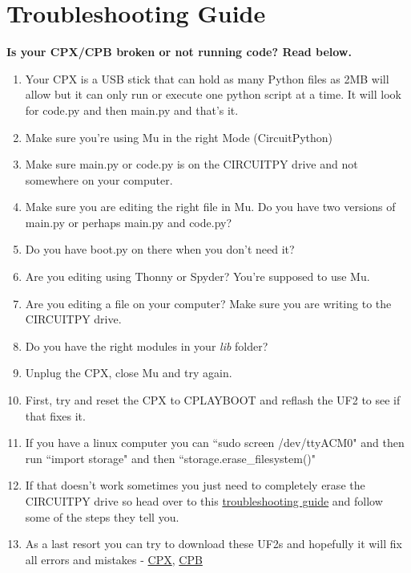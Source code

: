 \section{Troubleshooting Guide}

{\bf Is your CPX/CPB broken or not running code? Read below.}

\begin{enumerate}[itemsep=-5pt]
  \item Your CPX is a USB stick that can hold as many Python files as 2MB will allow but it can only run or execute one python script at a time. It will look for code.py and then main.py and that's it. 
  \item Make sure you're using Mu in the right Mode (CircuitPython)
  \item Make sure main.py or code.py is on the CIRCUITPY drive and not somewhere on your computer.
  \item Make sure you are editing the right file in Mu. Do you have two versions of main.py or perhaps main.py and code.py?
  \item Do you have boot.py on there when you don't need it?
  \item Are you editing using Thonny or Spyder? You're supposed to use Mu. 
  \item Are you editing a file on your computer? Make sure you are
    writing to the CIRCUITPY drive.
  \item Do you have the right modules in your {\it lib} folder?
  \item Unplug the CPX, close Mu and try again.
  \item First, try and reset the CPX to CPLAYBOOT and reflash the UF2 to see if that fixes it.
  \item If you have a linux computer you can ``sudo screen /dev/ttyACM0" and then run ``import storage" and then ``storage.erase\_filesystem()"
  \item If that doesn’t work sometimes you just need to completely erase the CIRCUITPY drive so head over to this \href{https://learn.adafruit.com/adafruit-circuit-playground-express/troubleshooting}{troubleshooting guide} and follow some of the steps they tell you.
  \item As a last resort you can try to download these UF2s and
    hopefully it will fix all errors and mistakes -
    \href{https://cdn-learn.adafruit.com/assets/assets/000/048/745/original/flash_erase_express.ino.circuitplay.uf2?1512152080}{CPX}, \href{https://cdn-learn.adafruit.com/assets/assets/000/082/950/original/CP_Bluefruit_QSPI_Erase.UF2?1572026649}{CPB}

\end{enumerate}
